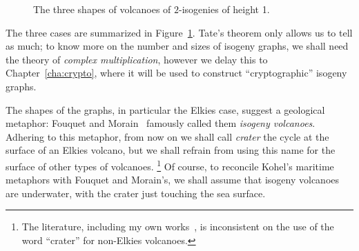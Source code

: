 \documentclass[b5layout]{hdr}
\begin{document}
\begin{figure}[h]
  \centering
  \caption{The three shapes of volcanoes of $2$-isogenies of height 1.}
  \label{fig:volcanology}
\end{figure}

The three cases are summarized in Figure~\ref{fig:volcanology}. %
Tate's theorem only allows us to tell as much; to know more on the
number and sizes of isogeny graphs, we shall need the theory of
\emph{complex multiplication}, however we delay this to
Chapter~\ref{cha:crypto}, where it will be used to construct
``cryptographic'' isogeny graphs. %

The shapes of the graphs, in particular the Elkies case, suggest a
geological metaphor: Fouquet and Morain~\cite{fouquet+morain02}
famously called them \emph{isogeny volcanoes}. %
Adhering to this metaphor, from now on we shall call \emph{crater} the
cycle at the surface of an Elkies volcano, but we shall refrain from
using this name for the surface of other types of volcanoes.%
\footnote{The literature, including my own
  works~\cite{defeo2016explicit}, is inconsistent on the use of the
  word ``crater'' for non-Elkies volcanoes.} %
Of course, to reconcile Kohel's maritime metaphors with Fouquet and
Morain's, we shall assume that isogeny volcanoes are underwater, with
the crater just touching the sea surface.
\end{document}
